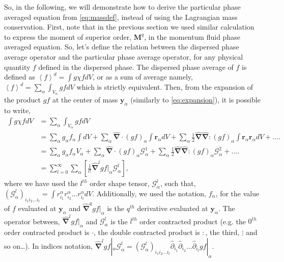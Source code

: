 So, in the following, we will demonstrate how to derive the particular phase averaged equation from \ref{eq:massdef}, instead of using the Lagrangian mass conservation. 
First, note that in the previous section we used similar calculation to express the moment of superior order, $\bm{M}^q$, in the momentum fluid phase averaged equation. 
So, let's define the relation between the dispersed phase average operator and the particular phase average operator, for any physical quantity  $f$ defined in the dispersed phase.
The dispersed phase average of $f$ is defined as $\left<f\right>^d = \int g\chi f dV$, or as a sum of average namely, $\left<f\right>^d = \sum_\alpha \int_{V_\alpha}g f dV$ which is strictly equivalent.
Then, from the expansion of the product $gf$ at the center of mass $\bm{y}_\alpha$ (similarly to \ref{eq:expansion}), it is possible to write, 
\begin{align}
    \int g \chi f  dV 
    &= \sum_\alpha \int_{V_\alpha} g f  dV \\
    &= \sum_\alpha g_\alpha f_\alpha \int   dV 
    + \sum_\alpha  \hat{\bm{\nabla}} \cdot (g f)_\alpha \int \bm{r}_\alpha dV 
    + \sum_\alpha \frac{1}{2}\hat{\bm{\nabla}}\hat{\bm{\nabla}} : (g f)_\alpha \int \bm{r}_\alpha\bm{r}_\alpha dV 
    + \ldots. \\
    &= \sum_\alpha g_\alpha f_\alpha V_\alpha 
    + \sum_\alpha  \hat{\bm{\nabla}} \cdot (g f)_\alpha \mathcal{G}_\alpha^1 
    + \sum_\alpha \frac{1}{2}\hat{\bm{\nabla}}\hat{\bm{\nabla}} : (g f)_\alpha \mathcal{G}_\alpha^2 
    + \ldots. \\
    \label{eq:exp}
    &= \sum_{l=0}^\infty \sum_\alpha \left[\frac{1}{l!} \hat{\bm{\nabla}}^l gf|_\alpha \mathcal{G}_\alpha^l\right],
\end{align}
where we have used the $l^{th}$ order shape tensor, $\mathcal{G}_\alpha^l$, such that, $(\mathcal{G}_\alpha^l)_{i_1 i_2\ldots i_l} = \int r^\alpha_{i_1}r^\alpha_{i_2}\ldots r^\alpha_{i_l}dV$.
Additionally, we used the notation, $f_\alpha$, for the value of $f$ evaluated at $\bm{y}_\alpha$ and $\hat{\bm{\nabla}}^q gf|_\alpha$ is the $q^{th}$ derivative evaluated at $\bm{y}_\alpha$.
The operator between, $\hat{\bm{\nabla}}^l gf|_\alpha$ and $\mathcal{G}_\alpha^l$ is the $l^{th}$ order contracted product (e.g. the $0^{th}$ order contracted product is $\cdot$, the double contracted product is $:$, the third, $\vdots$ and so on\ldots). 
In indices notation, $\hat{\bm{\nabla}}^l gf|_\alpha \mathcal{G}_\alpha^l  = (\mathcal{G}_\alpha^l)_{i_1 i_2\ldots i_l} \hat{\partial}_{i_1} \hat{\partial}_{i_2}\ldots \hat{\partial}_{i_l} gf|_\alpha$.
